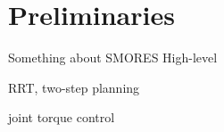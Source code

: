 \section{Preliminaries}\label{prelim}

Something about SMORES
High-level

RRT, two-step planning

joint torque control